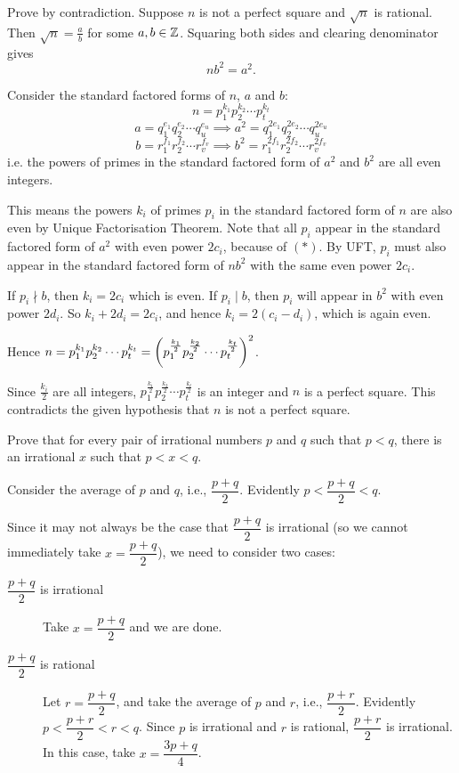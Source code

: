\begin{solution}
Prove by contradiction. Suppose $n$ is not a perfect square and $\sqrt{n}$ is rational. Then $\sqrt{n}=\frac{a}{b}$ for some $a,b\in\mathbb Z$. Squaring both sides and clearing denominator gives 
\begin{equation*}\tag{$\ast$}
nb^2=a^2.
\end{equation*}

Consider the standard factored forms of $n$, $a$ and $b$:
\[ n=p_1^{k_1}p_2^{k_2}\cdots p_t^{k_t} \]
\[ a=q_1^{e_1}q_2^{e_2}\cdots q_u^{e_u} \implies a^2=q_1^{2e_1}q_2^{2e_2}\cdots q_u^{2e_u} \]
\[ b=r_1^{f_1}r_2^{f_2}\cdots r_v^{f_v} \implies b^2=r_1^{2f_1}r_2^{2f_2}\cdots r_v^{2f_v} \]
i.e. the powers of primes in the standard factored form of $a^2$ and $b^2$ are all even integers. 

This means the powers $k_i$ of primes $p_i$ in the standard factored form of $n$ are also even by Unique Factorisation Theorem. Note that all $p_i$ appear in the standard factored form of $a^2$ with even power $2c_i$, because of $(\ast)$. By UFT, $p_i$ must also appear in the standard factored form of $nb^2$ with the same even power $2c_i$.

If $p_i\nmid b$, then $k_i=2c_i$ which is even. If $p_i\mid b$, then $p_i$ will appear in $b^2$ with even power $2d_i$. So $k_i+2d_i=2c_i$, and hence $k_i=2(c_i-d_i)$, which is again even.

Hence $n=p_1^{k_1}p_2^{k_2}\cdots p_t^{k_t}=\left(p_1^{\frac{k_1}{2}}p_2^{\frac{k_2}{2}}\cdots p_t^{\frac{k_t}{2}}\right)^2$.

Since $\frac{k_i}{2}$ are all integers, $p_1^{\frac{k_1}{2}}p_2^{\frac{k_2}{2}}\cdots p_t^{\frac{k_t}{2}}$ is an integer and $n$ is a perfect square. This contradicts the given hypothesis that $n$ is not a perfect square.
\end{solution}

\begin{exercise}
Prove that for every pair of irrational numbers $p$ and $q$ such that $p<q$, there is an irrational $x$ such that $p<x<q$.
\end{exercise}

\begin{solution}
Consider the average of $p$ and $q$, i.e., $\dfrac{p+q}{2}$. Evidently $p<\dfrac{p+q}{2}<q$.

Since it may not always be the case that $\dfrac{p+q}{2}$ is irrational (so we cannot immediately take $x=\dfrac{p+q}{2}$), we need to consider two cases:
\begin{description}
\item[$\dfrac{p+q}{2}$ is irrational] Take $x=\dfrac{p+q}{2}$ and we are done.
\item[$\dfrac{p+q}{2}$ is rational] Let $r=\dfrac{p+q}{2}$, and take the average of $p$ and $r$, i.e., $\dfrac{p+r}{2}$. Evidently $p<\dfrac{p+r}{2}<r<q$. Since $p$ is irrational and $r$ is rational, $\dfrac{p+r}{2}$ is irrational. In this case, take $x=\dfrac{3p+q}{4}$.
\end{description}
\end{solution}

